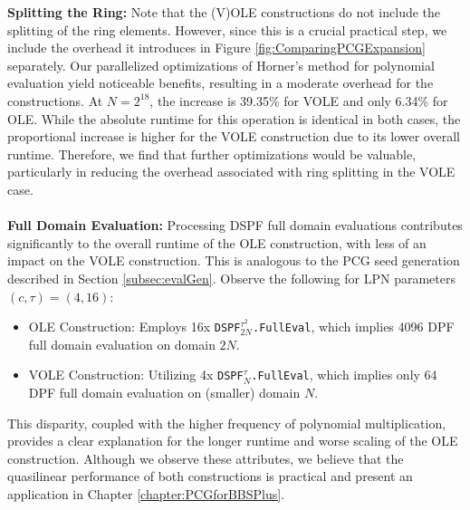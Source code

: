 \textbf{Splitting the Ring:} Note that the (V)OLE constructions do not include the splitting of the ring elements. However, since this is a crucial practical step, we include the overhead it introduces in Figure \ref{fig:ComparingPCGExpansion} separately. Our parallelized optimizations of Horner's method for polynomial evaluation yield noticeable benefits, resulting in a moderate overhead for the constructions. At $N=2^{18}$, the increase is 39.35\% for VOLE and only 6.34\% for OLE. While the absolute runtime for this operation is identical in both cases, the proportional increase is higher for the VOLE construction due to its lower overall runtime. Therefore, we find that further optimizations would be valuable, particularly in reducing the overhead associated with ring splitting in the VOLE case.
\\\\
\textbf{Full Domain Evaluation:} Processing DSPF full domain evaluations contributes significantly to the overall runtime of the OLE construction, with less of an impact on the VOLE construction. This is analogous to the PCG seed generation described in Section \ref{subsec:evalGen}. Observe the following for LPN parameters $(c,\tau)=(4,16)$:
\begin{itemize}
\item OLE Construction: Employs 16x \texttt{DSPF$^{\tau^2}_{2N}$.FullEval}, which implies 4096 DPF full domain evaluation on domain $2N$.
\item VOLE Construction: Utilizing 4x \texttt{DSPF$^{\tau}_{N}$.FullEval}, which implies only 64 DPF full domain evaluation on (smaller) domain $N$.
\end{itemize}
This disparity, coupled with the higher frequency of polynomial multiplication, provides a clear explanation for the longer runtime and worse scaling of the OLE construction. Although we observe these attributes, we believe that the quasilinear performance of both constructions is practical and present an application in Chapter \ref{chapter:PCGforBBSPlus}.
\\\\
